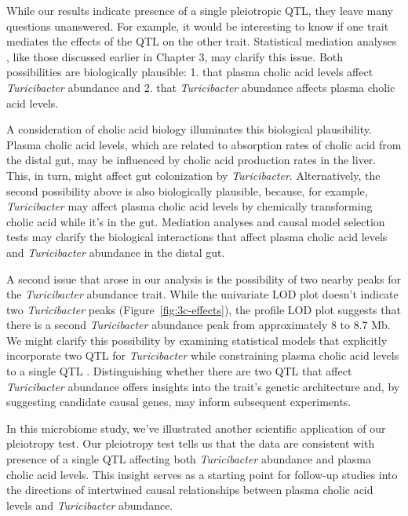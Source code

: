 \documentclass[oneside]{book}\usepackage[]{graphicx}\usepackage[]{color}
\begin{document}
While our results indicate presence of a single pleiotropic QTL, 
they leave many questions unanswered. For example, 
it would be interesting to know if one trait mediates the effects of the QTL on the other trait. 
Statistical mediation analyses \citep{chick2016defining}, 
like those discussed earlier in Chapter 3, may clarify this issue.
Both possibilities are biologically plausible: 1. that plasma cholic acid levels affect \emph{Turicibacter} abundance
and 
2. that \emph{Turicibacter} abundance affects plasma cholic 
acid levels.

A consideration of cholic acid biology illuminates this biological plausibility. 
Plasma cholic acid levels, which are related to 
absorption rates of cholic acid from the distal gut, 
may be influenced by cholic acid production rates in the liver. 
This, in turn, might affect gut colonization by \emph{Turicibacter}. 
Alternatively, the second possibility above is also 
biologically plausible, because, for example, 
\emph{Turicibacter} may affect plasma cholic acid levels by 
chemically transforming cholic acid while it's in the gut. 
Mediation analyses and causal model selection tests \citep{neto2013modeling} may clarify 
the biological interactions that affect plasma cholic 
acid levels and \emph{Turicibacter} abundance in the distal gut.

A second issue that arose in our analysis is the possibility of two nearby peaks 
for the \emph{Turicibacter} abundance trait. 
While the univariate LOD plot doesn't indicate two \emph{Turicibacter} peaks (Figure~\ref{fig:3c-effects}), 
the profile LOD plot suggests that there is a second \emph{Turicibacter} abundance 
peak from approximately 8 to 8.7 Mb. 
We might clarify this possibility by examining statistical models that 
explicitly incorporate two QTL for 
\emph{Turicibacter} while constraining plasma cholic acid levels to 
a single QTL \citep{schadt2005integrative}. Distinguishing whether there are two QTL that affect \emph{Turicibacter} abundance offers insights into the trait's genetic architecture and, by suggesting candidate causal genes, may inform subsequent experiments.

In this microbiome study, we've illustrated another scientific application of our pleiotropy test. 
Our pleiotropy test tells us that 
the data are consistent with presence of a single QTL affecting both
\emph{Turicibacter} abundance and plasma cholic acid levels. 
This insight serves as a starting point for follow-up studies into the directions of 
intertwined causal relationships between plasma cholic acid levels and \emph{Turicibacter} abundance.
\end{document}
